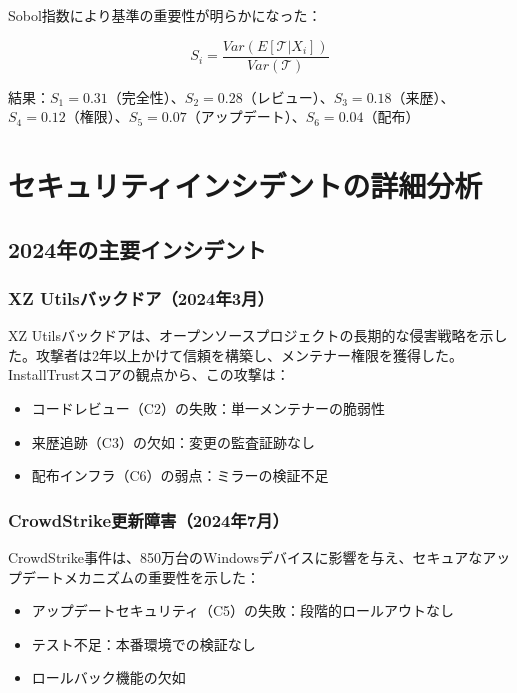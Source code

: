 \documentclass[Specialissue]{jsaiart}
\begin{document}
Sobol指数により基準の重要性が明らかになった：

\begin{equation}
S_i = \frac{Var(E[\mathcal{T}|X_i])}{Var(\mathcal{T})} 
\end{equation}

結果：$S_1 = 0.31$（完全性）、$S_2 = 0.28$（レビュー）、$S_3 = 0.18$（来歴）、$S_4 = 0.12$（権限）、$S_5 = 0.07$（アップデート）、$S_6 = 0.04$（配布）

\section{セキュリティインシデントの詳細分析}

\subsection{2024年の主要インシデント}

\subsubsection{XZ Utilsバックドア（2024年3月）}

XZ Utilsバックドア\cite{xz2024backdoor}は、オープンソースプロジェクトの長期的な侵害戦略を示した。攻撃者は2年以上かけて信頼を構築し、メンテナー権限を獲得した。InstallTrustスコアの観点から、この攻撃は：

\begin{itemize}
    \item コードレビュー（C2）の失敗：単一メンテナーの脆弱性
    \item 来歴追跡（C3）の欠如：変更の監査証跡なし
    \item 配布インフラ（C6）の弱点：ミラーの検証不足
\end{itemize}

\subsubsection{CrowdStrike更新障害（2024年7月）}

CrowdStrike事件\cite{crowdstrike2024outage}は、850万台のWindowsデバイスに影響を与え、セキュアなアップデートメカニズムの重要性を示した：

\begin{itemize}
    \item アップデートセキュリティ（C5）の失敗：段階的ロールアウトなし
    \item テスト不足：本番環境での検証なし
    \item ロールバック機能の欠如
\end{itemize}
\end{document}

